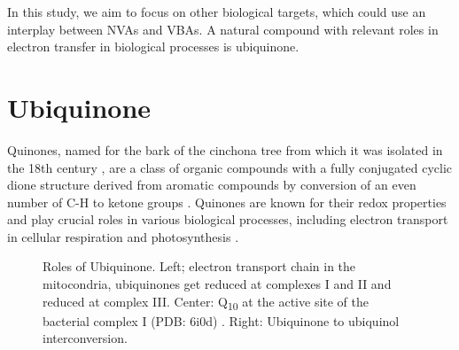 In this study, we aim to focus on other biological targets, which could use an interplay between NVAs and VBAs. A natural compound with relevant roles in electron transfer in biological processes is ubiquinone.

\section{Ubiquinone}
Quinones, named for the bark of the cinchona tree from which it was isolated in the 18th century \cite{rusell1873quinone}, are a class of organic compounds with a fully conjugated cyclic dione structure derived from aromatic compounds by conversion of an even number of C-H to ketone groups \cite{IUPACQ050152025}. Quinones are known for their redox properties and play crucial roles in various biological processes, including electron transport in cellular respiration and photosynthesis \cite{ernster1995biochemical,chen2024low}.

\begin{figure}[ht!]
  \centering
  \caption[Role of ubiquinone]{Roles of Ubiquinone. Left; electron transport chain in the mitocondria, ubiquinones get reduced at complexes I and II and reduced at complex III. Center: Q\textsubscript{10} at the active site of the bacterial complex I (PDB: 6i0d) \cite{gutierrez2020key}. Right: Ubiquinone to ubiquinol interconversion.}
  \label{fig:ETC}
\end{figure}

